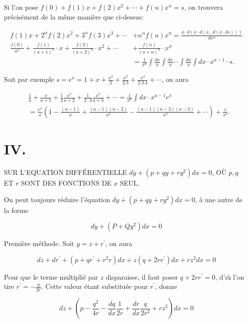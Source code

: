 \documentclass{article}
\begin{document}
Si l'on pose \(f(0)+f(1) x+f(2) x^{2}+\cdots+f(n) x^{n}=s\), on trouvera précisément de la même manière que ci-dessus:

\[
\begin{aligned}
f(1) x+2^{\alpha} f(2) x^{2}+3^{\alpha} f(3) x^{3}+\cdots & +n^{\alpha} f(n) x^{n}=\frac{x \cdot d(x \cdot d(x \ldots d(x \cdot d s)))}{d x^{\alpha}} \\
\frac{f(0)}{a^{\alpha}}+\frac{f(1)}{(a+1)^{\alpha}} \cdot x+\frac{f(2)}{(a+2)^{\alpha}} \cdot x^{2}+\cdots & +\frac{f(n)}{(a+n)^{\alpha}} \cdot x^{n} \\
& =\frac{1}{x^{a}} \int \frac{d x}{x} \int \frac{d x}{x} \cdots \int \frac{d x}{x} \int d x \cdot x^{a-1} \cdot s .
\end{aligned}
\]

Soit par exemple \(s=e^{x}=1+x+\frac{x^{2}}{2}+\frac{x^{3}}{2.3}+\frac{x^{4}}{2.3 .4}+\cdots\), on aura

\[
\begin{aligned}
& \frac{1}{a}+\frac{x}{a+1}+\frac{1}{2} \frac{x^{2}}{a+2}+\frac{1}{2 \cdot 3} \frac{x^{3}}{a+3}+\cdots=\frac{1}{x^{a}} \int d x \cdot x^{a-1} e^{x} \\
& =\frac{e^{x}}{x}\left(1-\frac{(a-1)}{x}+\frac{(a-1)(a-2)}{x^{2}}-\frac{(a-1)(a-2)(a-3)}{x^{3}}+\cdots\right)+\frac{c}{x^{a}} .
\end{aligned}
\]

\section*{IV.}

SUR L'EQUATION DIFFÉRENTIELLE \(d y+\left(p+q y+r y^{2}\right) d x=0\), OÙ \(p, q\) ET \(r\) SONT DES FONCTIONS DE \(x\) SEUL.

On peut toujours réduire l'équation \(d y+\left(p+q y+r y^{2}\right) d x=0\), à une autre de la forme

\[
d y+\left(P+Q y^{2}\right) d x=0
\]

Première méthode. Soit \(y=z+r^{\prime}\), on aura

\[
d z+d r^{\prime}+\left(p+q r^{\prime}+r^{2} r\right) d x+z\left(q+2 r r^{\prime}\right) d x+r z^{2} d x=0
\]

Pour que le terme multiplié par \(z\) disparaisse, il faut poser \(q+2 r r^{\prime}=0\), d'ıù l'on tire \(r^{\prime}=-\frac{q}{2 r}\). Cette valeur étant substituée pour \(r^{\prime}\), donne

\[
d z+\left(p-\frac{q^{2}}{4 r}-\frac{d q}{d x} \frac{1}{2 r}+\frac{d r}{d x} \frac{q}{2 r^{2}}+r z^{2}\right) d x=0
\]
\end{document}
